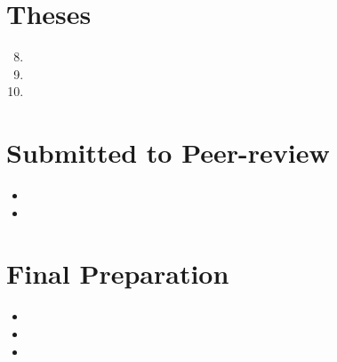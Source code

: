 \documentclass[a4paper]{article}
\begin{document}
\section*{Theses}

\begin{enumerate}
  \setcounter{enumi}{7}


  \item {}

  \item {}

  \item {}


\end{enumerate}


\section*{Submitted to Peer-review}

\begin{itemize}


  \item {}

  \item {}


\end{itemize}


\section*{Final Preparation}

\begin{itemize}


  \item {}

  \item {}

  \item {}


\end{itemize}
\end{document}

